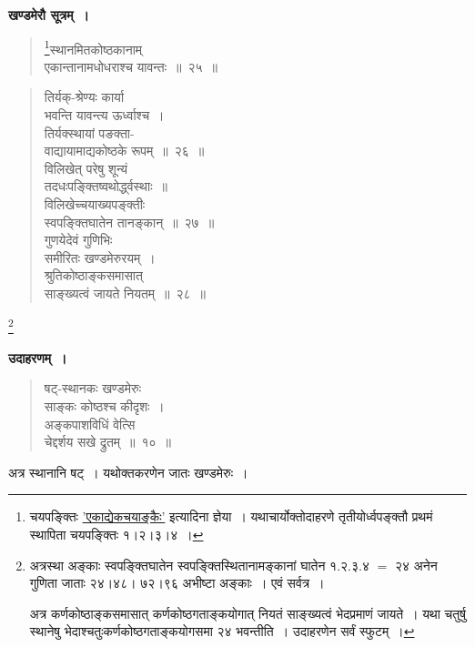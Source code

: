 \documentclass[11pt, openany]{book}
\begin{document}
\textbf{खण्डमेरौ सूत्रम्~।} 

 \label{13.25}
\begin{quote}
\renewcommand{\thefootnote}{१}\footnote{चयपङ्क्तिः \hyperref[13.10]{'एकाद्येकचयाङ्कैः'} इत्यादिना ज्ञेया~। यथाचार्योक्तोदाहरणे तृतीयोर्ध्वपङ्क्तौ प्रथमं स्थापिता चयपङ्क्तिः १।२।३।४~।}{\gk स्थानमितकोष्ठकानाम्\\
एकान्तानामधोधराश्च यावन्तः~॥~२५~॥}	
\end{quote}

\newpage

\begin{quote}
{\gk तिर्यक्-श्रेण्यः कार्या\\
भवन्ति यावन्त्य ऊर्ध्वाश्च~।\\
तिर्यक्स्थायां पङक्ता-\\
वाद्यायामाद्यकोष्ठके रूपम्~॥~२६~॥\\
विलिखेत् परेषु शून्यं\\
तदधःपङ्क्तिष्वथोर्द्ध्वस्थाः~॥\\
विलिखेच्चयाख्यपङ्क्तीः\\
स्वपङ्क्तिघातेन तानङ्कान्~॥~२७~॥\\
गुणयेदेवं गुणिभिः\\
समीरितः खण्डमेरुरयम्~।\\
श्रुतिकोष्ठाङ्कसमासात्\\
साङ्ख्यत्वं जायते नियतम्~॥~२८~॥~	}
\end{quote}

\renewcommand{\thefootnote}{}\footnote{\hspace{-8mm} अत्रस्था अङ्काः स्वपङ्क्तिघातेन स्वपङ्क्तिस्थितानामङ्कानां घातेन १.२.३.४ $=$ २४ अनेन गुणिता जाताः २४।४८। ७२।९६ अभीष्टा अङ्काः~। एवं सर्वत्र~।
\vspace{2mm}

अत्र कर्णकोष्ठाङ्कसमासात् कर्णकोष्ठगताङ्कयोगात् नियतं साङ्ख्यत्वं भेदप्रमाणं जायते~। यथा चतुर्षु स्थानेषु भेदाश्चतुःकर्णकोष्ठगताङ्कयोगसमा २४ भवन्तीति~। उदाहरणेन सर्वं स्फुटम्~।}

\newpage

\textbf{उदाहरणम्~।} 

\begin{quote}
{\ex षट्-स्थानकः खण्डमेरुः\\
साङ्कः कोष्ठश्च कीदृशः~।\\
अङ्कपाशविधिं वेत्सि\\
चेद्दर्शय सखे द्रुतम्~॥~१०~॥}
\end{quote}

अत्र स्थानानि षट्~। यथोक्तकरणेन जातः खण्डमेरुः~। 
\vspace{2mm}
\end{document}
